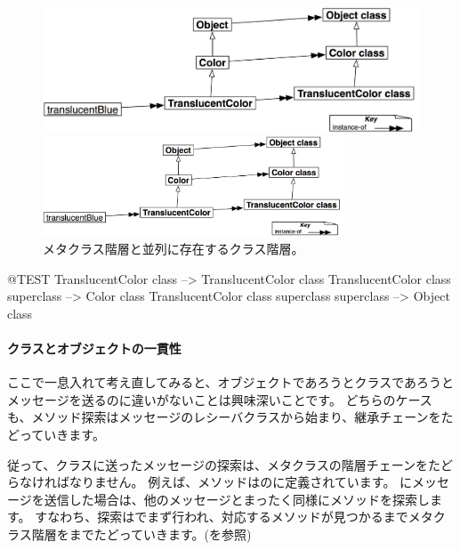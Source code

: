 \documentclass[a4paper,10pt,twoside]{book}
\begin{document}
\begin{center}
\begin{figure}[!ht]
\ifluluelse
	{\centerline {\includegraphics[width=\textwidth]{TranslucentMetaclassHierarchy}}}
	{\centerline {\includegraphics[width=0.8\textwidth]{TranslucentMetaclassHierarchy}}}
\caption{メタクラス階層と並列に存在するクラス階層。}
\end{figure}
\end{center}

\begin{code}{@TEST}
TranslucentColor class                                     --> TranslucentColor class
TranslucentColor class superclass                   --> Color class
TranslucentColor class superclass superclass --> Object class
\end{code}

\paragraph{クラスとオブジェクトの一貫性}
ここで一息入れて考え直してみると、オブジェクトであろうとクラスであろうとメッセージを送るのに違いがないことは興味深いことです。
どちらのケースも、メソッド探索はメッセージのレシーバクラスから始まり、継承チェーンをたどっていきます。

従って、クラスに送ったメッセージの探索は、メタクラスの階層チェーンをたどらなければなりません。
例えば、メソッドはのに定義されています。
にメッセージを送信した場合は、他のメッセージとまったく同様にメソッドを探索します。
すなわち、探索はでまず行われ、対応するメソッドが見つかるまでメタクラス階層をまでたどっていきます。(を参照)
\end{document}
